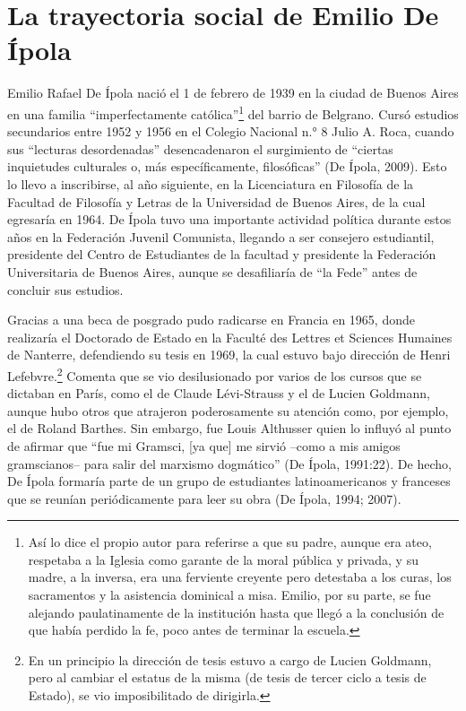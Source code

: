 \section{La trayectoria social de Emilio De Ípola}

Emilio Rafael De Ípola nació el 1 de febrero de 1939 en la ciudad de Buenos Aires en una familia \enquote{imperfectamente católica}\footnote{Así lo dice el propio autor para referirse a que su padre, aunque era ateo, respetaba a la Iglesia como garante de la moral pública y privada, y su madre, a la inversa, era una ferviente creyente pero detestaba a los curas, los sacramentos y la asistencia dominical a misa. Emilio, por su parte, se fue alejando paulatinamente de la institución hasta que llegó a la conclusión de que había perdido la fe, poco antes de terminar la escuela.} del barrio de Belgrano. Cursó estudios secundarios entre 1952 y 1956 en el Colegio Nacional n.° 8 Julio A. Roca, cuando sus \enquote{lecturas desordenadas} desencadenaron el surgimiento de \enquote{ciertas inquietudes culturales o, más específicamente, filosóficas} (De Ípola, 2009). Esto lo llevo a inscribirse, al año siguiente, en la Licenciatura en Filosofía de la Facultad de Filosofía y Letras de la Universidad de Buenos Aires, de la cual egresaría en 1964. De Ípola tuvo una importante actividad política durante estos años en la Federación Juvenil Comunista, llegando a ser consejero estudiantil, presidente del Centro de Estudiantes de la facultad y presidente la Federación Universitaria de Buenos Aires, aunque se desafiliaría de \enquote{la Fede} antes de concluir sus estudios.

Gracias a una beca de posgrado pudo radicarse en Francia en 1965, donde realizaría el Doctorado de Estado en la Faculté des Lettres et Sciences Humaines de Nanterre, defendiendo su tesis en 1969, la cual estuvo bajo dirección de Henri Lefebvre.\footnote{En un principio la dirección de tesis estuvo a cargo de Lucien Goldmann, pero al cambiar el estatus de la misma (de tesis de tercer ciclo a tesis de Estado), se vio imposibilitado de dirigirla.} Comenta que se vio desilusionado por varios de los cursos que se dictaban en París, como el de Claude Lévi-Strauss y el de Lucien Goldmann, aunque hubo otros que atrajeron poderosamente su atención como, por ejemplo, el de Roland Barthes. Sin embargo, fue Louis Althusser quien lo influyó al punto de afirmar que \enquote{fue mi Gramsci, [ya que] me sirvió --como a mis amigos gramscianos-- para salir del marxismo dogmático} (De Ípola, 1991:22). De hecho, De Ípola formaría parte de un grupo de estudiantes latinoamericanos y franceses que se reunían periódicamente para leer su obra (De Ípola, 1994; 2007).

